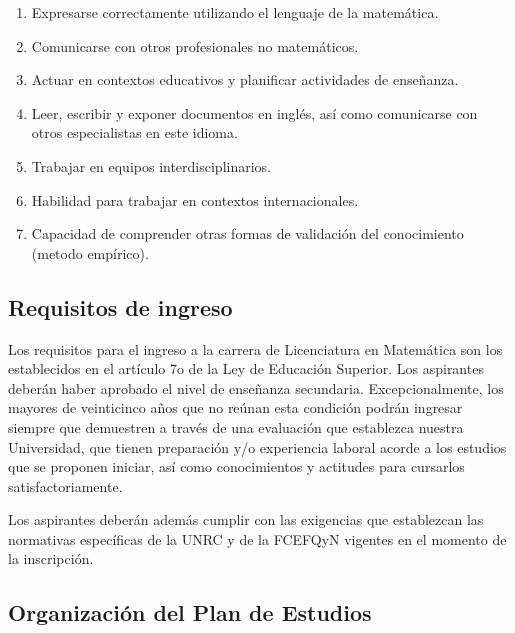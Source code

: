 \documentclass[a4paper, 12pt]{article}
\begin{document}
\begin{enumerate}
\item {Expresarse correctamente
utilizando el lenguaje de la
matemática.} 
 


\item {Comunicarse
con otros profesionales no matemáticos}. 

 

\item {Actuar en contextos educativos y planificar actividades de enseñanza}. 
 


\item {Leer, escribir y exponer documentos en
inglés, así como comunicarse con otros
especialistas en este idioma}. 

 


\item {Trabajar en equipos
interdisciplinarios.} 


\item Habilidad para trabajar en contextos internacionales.
 
\item Capacidad de  comprender otras formas de validación del conocimiento (metodo empírico).  


\end{enumerate}


\subsection{Requisitos de ingreso}


Los requisitos para el ingreso a la carrera de Licenciatura en Matemática son los establecidos
en el artículo 7o de la Ley de Educación Superior. Los aspirantes deberán haber aprobado
el nivel de enseñanza secundaria. Excepcionalmente, los mayores de veinticinco años que
no reúnan esta condición podrán ingresar siempre que demuestren a través de una
evaluación que establezca nuestra Universidad, que tienen preparación y/o experiencia
laboral acorde a los estudios que se proponen iniciar, así como conocimientos y actitudes
para cursarlos satisfactoriamente.

Los aspirantes deberán además cumplir con las exigencias
 que establezcan las normativas específicas de la UNRC y de la FCEFQyN    vigentes en el momento 
 de la inscripción. 




\subsection{Organización del Plan de Estudios}
\end{document}
